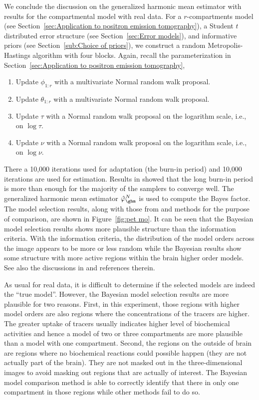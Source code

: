 We conclude the discussion on the generalized harmonic mean estimator with results for the \pet compartmental model with real data. For a $r$-compartments \pet model (see Section~\ref{sec:Application to positron emission tomography}), a Student $t$ distributed error structure (see Section~\ref{sec:Error models}), and informative priors (see Section~\ref{sub:Choice of priors}), we construct a random Metropolis-Hastings algorithm with four blocks. Again, recall the parameterization in Section~\ref{sec:Application to positron emission tomography},
\begin{enumerate}
  \item Update $\phi_{1:r}$ with a multivariate Normal random walk proposal.
  \item Update $\theta_{1:r}$ with a multivariate Normal random walk proposal.
  \item Update $\tau$ with a Normal random walk proposal on the logarithm
    scale, i.e., on $\log\tau$.
  \item Update $\nu$ with a Normal random walk proposal on the logarithm
    scale, i.e., on $\log\nu$.
\end{enumerate}
There  a 10,000 iterations used for adaptation (the burn-in period) and 10,000 iterations are used for estimation. Results in \cite{Zhou2013} showed that the long burn-in period is more than enough for the majority of the samplers to converge well. The generalized harmonic mean estimator $\hat\varphi_{\ghm}^N$ is used to compute the Bayes factor. The model selection results, along with those from \aic and \bic methods for the purpose of comparison, are shown in Figure~\ref{fig:pet mo}. It can be seen that the Bayesian model selection results shows more plausible structure than the information criteria. With the information criteria, the distribution of the model orders across the image appears to be more or less random while the Bayesian results show some structure with more active regions within the brain  higher order models. See also the discussions in \cite{Zhou2013} and references therein.

\begin{draftpar}
As usual for real data, it is difficult to determine if the selected models are indeed the ``true model''. However, the Bayesian model selection results are more plausible for two reasons. First, in this experiment, those regions with higher model orders are also regions where the concentrations of the tracers are higher. The greater uptake of tracers usually indicates higher level of biochemical activities and hence a model of two or three compartments are more plausible than a model with one compartment. Second, the regions on the outside of brain are regions where no biochemical reactions could possible happen (they are not actually part of the brain). They are not masked out in the three-dimensional images to avoid masking out regions that are actually of interest. The Bayesian model comparison method is able to correctly identify that there in only one compartment in those regions while other methods fail to do so.
\end{draftpar} 

